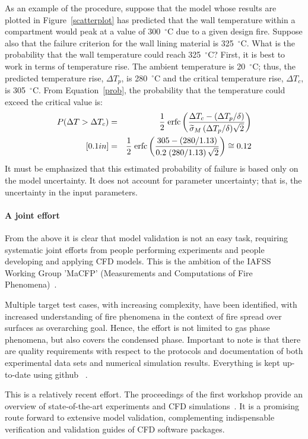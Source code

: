 \documentclass[graybox]{svmult}
\begin{document}
As an example of the procedure, suppose that the model whose results are plotted in Figure~\ref{scatterplot} has predicted that the wall temperature within a compartment would peak at a value of 300~$^\circ$C due to a given design fire. Suppose also that the failure criterion for the wall lining material is 325~$^\circ$C. What is the probability that the wall temperature could reach 325~$^\circ$C? First, it is best to work in terms of temperature rise. The ambient temperature is 20~$^\circ$C; thus, the predicted temperature rise, $\Delta T_p$, is 280~$^\circ$C and the critical temperature rise, $\Delta T_c$, is 305~$^\circ$C. From Equation~\ref{prob}, the probability that the temperature could exceed the critical value is:
\begin{eqnarray}
   P(\Delta T>\Delta T_c) &=& \frac{1}{2} \; \hbox{erfc} \left( \frac{\Delta T_c-(\Delta T_p/\delta)}{\widetilde{\sigma}_M \, (\Delta T_p/\delta) \sqrt{2}} \right) \nonumber \\ [0.1in]
    &=& \frac{1}{2} \; \hbox{erfc} \left( \frac{305-(280/1.13)}{0.2 \; (280/1.13) \, \sqrt{2}} \right) \cong 0.12
\end{eqnarray}
It must be emphasized that this estimated probability of failure is based only on the model uncertainty. It does not account for parameter uncertainty; that is, the uncertainty in the input parameters.

\paragraph{A joint effort}

From the above it is clear that model validation is not an easy task, requiring systematic joint efforts from people performing experiments and people developing and applying CFD models. This is the ambition of the IAFSS Working Group 'MaCFP' (Measurements and Computations of Fire Phenomena)~\cite{MaCFPsite}.

Multiple target test cases, with increasing complexity, have been identified, with increased understanding of fire phenomena in the context of fire spread over surfaces as overarching goal. Hence, the effort is not limited to gas phase phenomena, but also covers the condensed phase. Important to note is that there are quality requirements with respect to the protocols and documentation of both experimental data sets and numerical simulation results. Everything is kept up-to-date using github ~\cite{MaCFPgithub}.

This is a relatively recent effort. The proceedings of the first workshop provide an overview of state-of-the-art experiments and CFD simulations~\cite{MaCFPpaper}. It is a promising route forward to extensive model validation, complementing indispensable verification and validation guides of CFD software packages.
\end{document}
